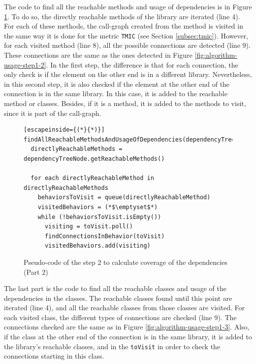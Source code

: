 The code to find all the reachable methods and usage of dependencies is in Figure \ref{fig:algorithm-usage-step2-2}. To do so, the directly reachable methods of the library are iterated (line 4). For each of these methods, the call-graph created from the method is visited in the same way it is done for the metric \texttt{TMIC} (see Section \ref{subsec:tmic}). However, for each visited method (line 8), all the possible connections are detected (line 9). These connections are the same as the ones detected in Figure \ref{fig:algorithm-usage-step1-2}. In the first step, the difference is that for each connection, the only check is if the element on the other end is in a different library. Nevertheless, in this second step, it is also checked if the element at the other end of the connection is in the same library. In this case, it is added to the reachable method or classes. Besides, if it is a method, it is added to the methods to visit, since it is part of the call-graph.

\begin{figure}[ht!]
\begin{lstlisting}[escapeinside={(*}{*)}]
findAllReachableMethodsAndUsageOfDependencies(dependencyTreeNode)
  directlyReachableMethods = dependencyTreeNode.getReachableMethods()

  for each directlyReachableMethod in directlyReachableMethods
    behaviorsToVisit = queue(directlyReachableMethod)
    visitedBehaviors = (*$\emptyset$*)
    while (!behaviorsToVisit.isEmpty())
      visiting = toVisit.poll()
      findConnectionsInBehavior(toVisit)
      visitedBehaviors.add(visiting)
\end{lstlisting}
\caption{Pseudo-code of the step 2 to calculate coverage of the dependencies (Part 2)}
\label{fig:algorithm-usage-step2-2}
\end{figure}

The last part is the code to find all the reachable classes and usage of the dependencies in the classes. The reachable classes found until this point are iterated (line 4), and all the reachable classes from those classes are visited. For each visited class, the different types of connections are checked (line 9). The connections checked are the same as in Figure \ref{fig:algorithm-usage-step1-3}. Also, if the class at the other end of the connection is in the same library, it is added to the library's reachable classes, and in the \texttt{toVisit} in order to check the connections starting in this class.

